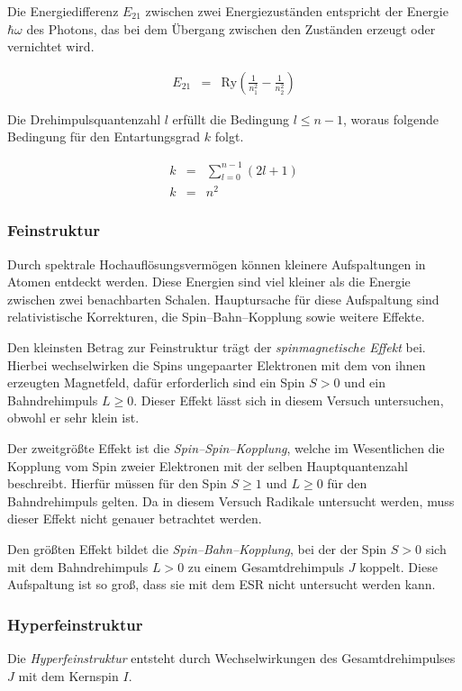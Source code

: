\documentclass[12pt,a4paper]{scrartcl}
\numberwithin{equation}{section} %
\begin{document}
\noindent
Die Energiedifferenz $E_{21}$ zwischen zwei Energiezuständen entspricht der Energie $\hbar\omega$ des Photons, das bei dem Übergang zwischen den Zuständen erzeugt oder vernichtet wird.

\begin{eqnarray}
	E_{21} &=& \mathrm{Ry} \left( \frac{1}{n_1^2} - \frac{1}{n_2^2} \right)
\end{eqnarray}

\noindent
Die Drehimpulsquantenzahl $l$ erfüllt die Bedingung $l \leq n - 1$, woraus folgende Bedingung für den Entartungsgrad $k$ folgt.

\begin{eqnarray}
	k &=& \sum_{l=0}^{n-1} (2l+1) \\
	k &=& n^2
\end{eqnarray}

\subsubsection{Feinstruktur}
Durch spektrale Hochauflösungsvermögen können kleinere Aufspaltungen in Atomen entdeckt werden. Diese Energien sind viel kleiner als die Energie zwischen zwei benachbarten Schalen. Hauptursache für diese Aufspaltung sind relativistische Korrekturen, die Spin--Bahn--Kopplung sowie weitere Effekte. \cite{Weber}

Den kleinsten Betrag zur Feinstruktur trägt der \emph{spinmagnetische Effekt} bei. Hierbei wechselwirken die Spins ungepaarter Elektronen mit dem von ihnen erzeugten Magnetfeld, dafür erforderlich sind ein Spin $S>0$ und ein Bahndrehimpuls $L\geq 0$. Dieser Effekt lässt sich in diesem Versuch untersuchen, obwohl er sehr klein ist.

Der zweitgrößte Effekt ist die \emph{Spin--Spin--Kopplung}, welche im Wesentlichen die Kopplung vom Spin zweier Elektronen mit der selben Hauptquantenzahl beschreibt. Hierfür müssen für den Spin $S\geq 1$ und $L\geq 0$ für den Bahndrehimpuls gelten. Da in diesem Versuch Radikale untersucht werden, muss dieser Effekt nicht genauer betrachtet werden.

Den größten Effekt bildet die \emph{Spin--Bahn--Kopplung}, bei der der Spin $S>0$ sich mit dem Bahndrehimpuls $L>0$ zu einem Gesamtdrehimpuls $J$ koppelt. Diese Aufspaltung ist so groß, dass sie mit dem ESR nicht untersucht werden kann.

\subsubsection{Hyperfeinstruktur}
Die \emph{Hyperfeinstruktur} entsteht durch Wechselwirkungen des Gesamtdrehimpulses $J$ mit dem Kernspin $I$.
\end{document}
